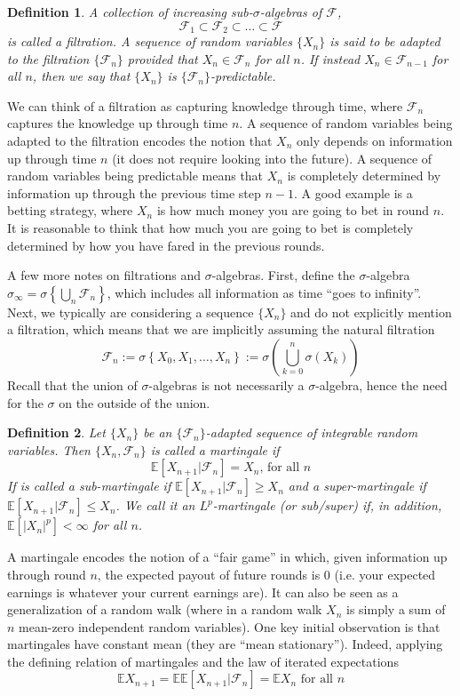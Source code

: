 \documentclass[12pt]{article}
\newcommand*{\abs}[1]{\left\lvert#1\right\rvert}
\newcommand{\E}{\mathbb{E}}
\newtheorem{definition}{Definition}
\begin{document}
\begin{definition}
A collection of increasing sub-$\sigma$-algebras of $\mathcal{F}$, 
\[\mathcal{F}_1 \subset \mathcal{F}_2 \subset \dots \subset \mathcal{F}\]
 is called a \textit{filtration}. A sequence of random variables $\{X_n\}$ is said to be \textit{adapted} to the filtration $\{\mathcal{F}_n\}$ provided that $X_n \in \mathcal{F}_n$ for all $n$. 
 If instead $X_n \in \mathcal{F}_{n-1}$ for all $n$, then we say that $\{X_n\}$ is $\{\mathcal{F}_n\}$-predictable. 
\end{definition}
We can think of a filtration as capturing knowledge through time, where $\mathcal{F}_n$ captures the knowledge up through time $n$. A sequence of random variables being adapted to the filtration encodes the 
notion that $X_n$ only depends on information up through time $n$ (it does not require looking into the future). A sequence of random variables being predictable means that $X_n$ is completely determined by 
information up through the previous time step $n - 1$. A good example is a betting strategy, where $X_n$ is how much money you are going to bet in round $n$. It is reasonable to think that how much you are going to 
bet is completely determined by how you have fared in the previous rounds. 

A few more notes on filtrations and $\sigma$-algebras. First, define the $\sigma$-algebra $\sigma_\infty = \sigma \left\{\bigcup_{n} \mathcal{F}_n \right\}$, 
which includes all information as time ``goes to infinity''. Next, we typically are considering a sequence $\{X_n\}$ and do not explicitly mention a filtration, which means that we are implicitly assuming the natural filtration
\[\mathcal{F}_n := \sigma\left\{X_0, X_1, \dots, X_n \right\} := \sigma\left(\bigcup_{k = 0}^{n} \sigma(X_k) \right)\]
Recall that the union of $\sigma$-algebras is not necessarily a $\sigma$-algebra, hence the need for the $\sigma$ on the outside of the union. 

\begin{definition}
Let $\{X_n\}$ be an $\{\mathcal{F}_n\}$-adapted sequence of integrable random variables. Then $\{X_n, \mathcal{F}_n\}$ is called a \textit{martingale} if 
\[\E[X_{n + 1}|\mathcal{F}_n] = X_n \text{, for all } n\]
If is called a sub-martingale if $\E[X_{n + 1}|\mathcal{F}_n] \geq X_n$ and a super-martingale if $\E[X_{n + 1}|\mathcal{F}_n] \leq X_n$. We call it an $L^p$-martingale (or sub/super) if, in addition, $\E[\abs{X_n}^p] < \infty$ for all $n$. 
\end{definition}
A martingale encodes the notion of a ``fair game'' in which, given information up through round $n$, the expected payout of future rounds is $0$ (i.e. your expected earnings is whatever your current earnings are). It can also be seen 
as a generalization of a random walk (where in a random walk $X_n$ is simply a sum of $n$ mean-zero independent random variables). One key initial observation is that martingales have constant mean (they are ``mean stationary''). 
Indeed, applying the defining relation of martingales and the law of iterated expectations
\[\E X_{n+1} = \E \E[X_{n + 1}|\mathcal{F}_n] = \E X_n \text{ for all } n\]
\end{document}
